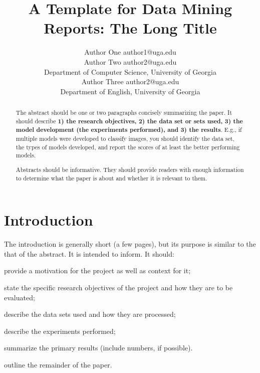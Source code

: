 \documentclass[jair,twoside,11pt,theapa]{article}
\begin{document}
\setlength{\parindent}{0em}
\setlength{\parskip}{0.5em}

\title{A Template for Data Mining Reports: The Long Title}

\author{\name Author One \email author1@uga.edu \\
        \name Author Two \email author2@uga.edu \\
        \addr Department of Computer Science, University of Georgia
      
       \AND
       \name Author Three \email author2@uga.edu \\
       \addr Department of English, University of Georgia}


\maketitle


\begin{abstract}
The abstract should be one or two paragraphs concisely summarizing the paper. It should describe {\color{blue}\textbf{1) the research objectives, 2) the data set or sets used, 3) the model development (the experiments performed), and 3) the results}}. E.g., if multiple models were developed to classify images, you should identify the data set, the types of models developed, and report the scores of at least the better performing models.

Abstracts should be informative. They should provide readers with enough information to determine what the paper is about and whether it is relevant to them.
\end{abstract}

\section{Introduction}
\label{Introduction}

The introduction is generally short (a few pages), but its purpose is similar to the that of the abstract. It is intended to inform. It should:
{\color{blue}
\begin{compactenum}
\item  provide a motivation for the project as well as context for it;
\item  state the specific research objectives of the project and how they are to be evaluated;
\item  describe the data sets used and how they are processed;
\item  describe the experiments performed;
\item  summarize the primary results (include numbers, if possible).
\item  outline the remainder of the paper.
\end{compactenum}}
\vspace{6pt}
\end{document}
